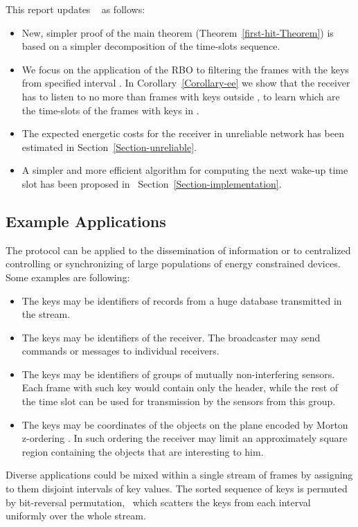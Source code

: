 \documentclass{article}
\newenvironment{itemizedot}{\begin{itemize} \renewcommand{\labelitemi}{}\renewcommand{\labelitemii}{}\renewcommand{\labelitemiii}{}\renewcommand{\labelitemiv}{}}{\end{itemize}}
\begin{document}
This report updates \ {\cite{DBLP:journals/corr/abs-1108-5095}} as follows:
\begin{itemizedot}
  \item New, simpler  proof of the main theorem (Theorem~\ref{first-hit-Theorem}) is
  based on a simpler decomposition of the time-slots sequence.
  
  \item We focus on the application of the RBO to  filtering the frames with
  the keys from specified interval . In
  Corollary~\ref{Corollary-ee} we show that the receiver has to listen to no
  more than  frames with keys outside , to learn
  which are the time-slots of the frames with keys in .
  
  \item The expected energetic costs for the receiver in unreliable network
  has been estimated in Section~\ref{Section-unreliable}.
  
  \item A simpler and more efficient algorithm for computing the next wake-up
  time slot has been proposed in \ Section~\ref{Section-implementation}.
\end{itemizedot}


\subsection{Example Applications}

The protocol can be applied to the dissemination of information or to
centralized controlling or synchronizing of large populations of energy
constrained devices. Some examples are following:
\begin{itemize}
  \item The keys may be identifiers of records from a huge database
  transmitted in the stream.
  
  \item The keys may be identifiers of the receiver. The broadcaster may send
  commands or messages to individual receivers.
  
  \item The keys may be identifiers of groups of mutually non-interfering
  sensors. Each frame with such key would contain only the header, while the
  rest of the time slot can be used for transmission by the sensors from this
  group.
  
  \item The keys may be coordinates of the objects on the plane encoded by
  Morton z-ordering {\cite{ZorderMorton}}. In such ordering the receiver may
  limit an approximately square region containing the objects that are
  interesting to him.
  
\end{itemize}
 Diverse applications could be mixed within a single stream of frames
  by assigning to them disjoint intervals of key values. The sorted sequence
  of keys is permuted by bit-reversal permutation, \ which scatters the keys
  from each interval uniformly over the whole stream.
\end{document}
